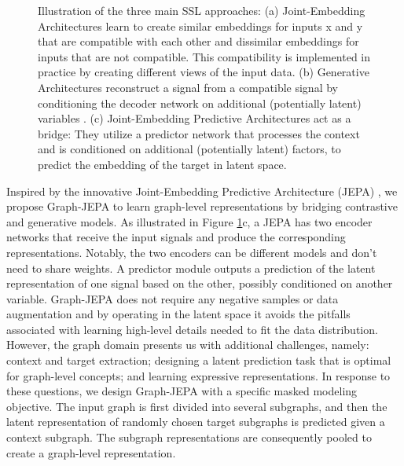 \documentclass{article} \usepackage{iclr2024_conference,times}
\begin{document}
\begin{figure}
    \centering
    \caption{Illustration of the three main SSL approaches: (a) Joint-Embedding Architectures learn to create similar embeddings for inputs x and y that are compatible with each other and dissimilar embeddings for inputs that are not compatible. This compatibility is implemented in practice by creating different views of the input data. (b) Generative Architectures reconstruct a signal  from a compatible signal  by conditioning the decoder network on additional (potentially latent) variables . (c) Joint-Embedding Predictive Architectures act as a bridge: They utilize a predictor network that processes the context  and is conditioned on additional (potentially latent) factors, to predict the embedding of the target  in latent space.
    }
    \label{fig:jepa-diagram}
\end{figure}

Inspired by the innovative Joint-Embedding Predictive Architecture (JEPA) \citep{lecun2022path,assran2023self}, we propose Graph-JEPA to learn graph-level representations by bridging contrastive and generative models. As illustrated in Figure \ref{fig:jepa-diagram}c, a JEPA has two encoder networks that receive the input signals and produce the corresponding representations. Notably, the two encoders can be different models and don't need to share weights. A predictor module outputs a prediction of the latent representation of one signal based on the other, possibly conditioned on another variable. Graph-JEPA does not require any negative samples or data augmentation and by operating in the latent space it avoids the pitfalls associated with learning high-level details needed to fit the data distribution. However, the graph domain presents us with additional challenges, namely: context and target extraction; designing a latent prediction task that is optimal for graph-level concepts; and learning expressive representations. In response to these questions, we design Graph-JEPA  with a specific masked modeling objective. The input graph is first divided into several subgraphs, and then the latent representation of randomly chosen target subgraphs is predicted given a context subgraph. The subgraph representations are consequently pooled to create a graph-level representation. 
\end{document}
